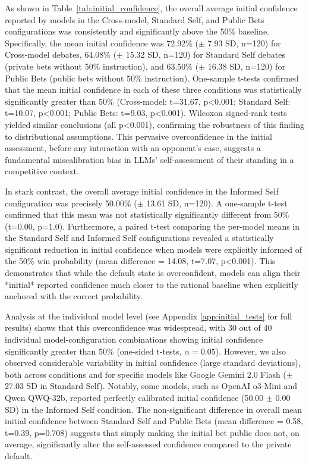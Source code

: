 \documentclass{article}
\begin{document}
As shown in Table~\ref{tab:initial_confidence}, the overall average initial confidence reported by models in the Cross-model, Standard Self, and Public Bets configurations was consistently and significantly above the 50\% baseline. Specifically, the mean initial confidence was 72.92\% ($\pm$ 7.93 SD, n=120) for Cross-model debates, 64.08\% ($\pm$ 15.32 SD, n=120) for Standard Self debates (private bets without 50\% instruction), and 63.50\% ($\pm$ 16.38 SD, n=120) for Public Bets (public bets without 50\% instruction). One-sample t-tests confirmed that the mean initial confidence in each of these three conditions was statistically significantly greater than 50\% (Cross-model: t=31.67, p<0.001; Standard Self: t=10.07, p<0.001; Public Bets: t=9.03, p<0.001). Wilcoxon signed-rank tests yielded similar conclusions (all p<0.001), confirming the robustness of this finding to distributional assumptions. This pervasive overconfidence in the initial assessment, before any interaction with an opponent's case, suggests a fundamental miscalibration bias in LLMs' self-assessment of their standing in a competitive context.

In stark contrast, the overall average initial confidence in the Informed Self configuration was precisely 50.00\% ($\pm$ 13.61 SD, n=120). A one-sample t-test confirmed that this mean was not statistically significantly different from 50\% (t=0.00, p=1.0). Furthermore, a paired t-test comparing the per-model means in the Standard Self and Informed Self configurations revealed a statistically significant reduction in initial confidence when models were explicitly informed of the 50\% win probability (mean difference = 14.08, t=7.07, p<0.001). This demonstrates that while the default state is overconfident, models can align their *initial* reported confidence much closer to the rational baseline when explicitly anchored with the correct probability.

Analysis at the individual model level (see Appendix \ref{app:initial_tests} for full results) shows that this overconfidence was widespread, with 30 out of 40 individual model-configuration combinations showing initial confidence significantly greater than 50\% (one-sided t-tests, $\alpha=0.05$). However, we also observed considerable variability in initial confidence (large standard deviations), both across conditions and for specific models like Google Gemini 2.0 Flash ($\pm$ 27.03 SD in Standard Self). Notably, some models, such as OpenAI o3-Mini and Qwen QWQ-32b, reported perfectly calibrated initial confidence (50.00 $\pm$ 0.00 SD) in the Informed Self condition. The non-significant difference in overall mean initial confidence between Standard Self and Public Bets (mean difference = 0.58, t=0.39, p=0.708) suggests that simply making the initial bet public does not, on average, significantly alter the self-assessed confidence compared to the private default.
\end{document}
